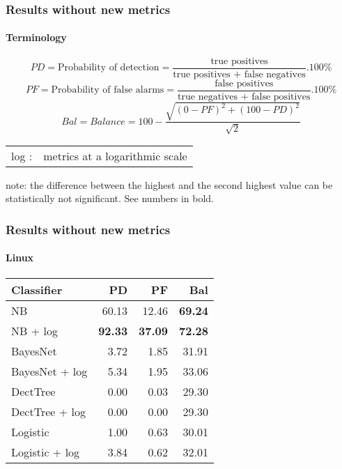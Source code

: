 \begin{frame}
 \frametitle{Results without new metrics}
 \framesubtitle{Terminology}
 $$PD = \text{Probability of detection} = \frac{\text{true positives}}{\text{true positives + false negatives}} . 100\%$$
 \vspace{0.1cm}
 $$PF = \text{Probability of false alarms} = \frac{\text{false positives}}{\text{true negatives + false positives}} . 100\%$$
 \vspace{0.1cm}
 $$Bal = Balance = 100 - \frac{\sqrt{(0-PF)^2 + (100-PD)^2}}{\sqrt{2}}$$
 \begin{center}
  \begin{tabular}{ll}
   log : & metrics at a logarithmic scale
  \end{tabular}
 \end{center}
 \small note: the difference between the highest and the second highest value can be statistically not significant. See numbers in bold. \normalsize
\end{frame}

\begin{frame}
 \frametitle{Results without new metrics}
 \framesubtitle{Linux}
 \begin{center}
 \begin{tabular}{lrrr}
  \hspace{0.2cm} Classifier & PD & PF & Bal\\
  \hline
  NB & 60.13 & 12.46 & \textbf{69.24}\\
  NB + log &  \textbf{92.33} & \textbf{37.09} & \textbf{72.28}\\
  BayesNet & 3.72 & 1.85 & 31.91\\
  BayesNet + log & 5.34 & 1.95 & 33.06\\
  DectTree & 0.00 & 0.03 & 29.30\\
  DectTree + log & 0.00 & 0.00 & 29.30\\
  Logistic & 1.00 & 0.63 & 30.01\\
  Logistic + log & 3.84 & 0.62 & 32.01\\
  \hline
 \end{tabular}
 \end{center}
\end{frame}

